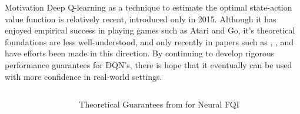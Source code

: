 \documentclass[final]{beamer}
\newlength{\sepwidth}
\newlength{\colwidth}
\newcommand{\separatorcolumn}{\begin{column}{\sepwidth}\end{column}}
\begin{document}
\begin{frame}[t]
\vfill
\begin{block}{\large Motivation}
Deep Q-learning as a technique to estimate the optimal state-action value function is relatively recent, introduced only in 2015.  Although it has enjoyed empirical success in playing games such as Atari and Go, it's theoretical foundations are less well-understood, and only recently in papers such as \cite{finite}, \cite{theor}, and \cite{div} have efforts been made in this direction.  By continuing to develop rigorous performance guarantees for DQN's, there is hope that it eventually can be used with more confidence in real-world settings.
\newline

\end{block}
\vspace{-2cm}
\begin{columns}[t]
\separatorcolumn

\begin{column}{\colwidth}

  \begin{block}{Theoretical Guarantees from \cite{theor} for Neural FQI}
            

\end{block}
\end{column}
\end{columns}
\end{frame}
\end{document}
